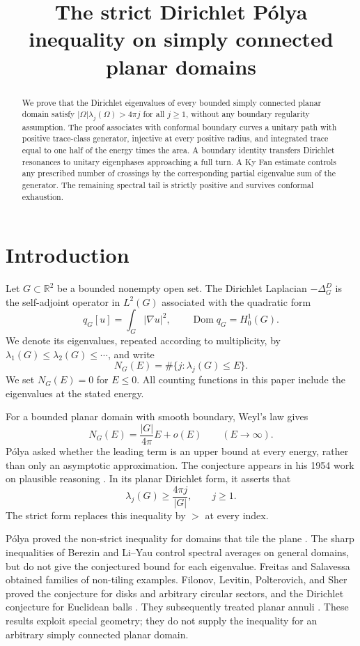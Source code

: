 \documentclass[11pt]{amsart}
\title[The strict Dirichlet P\'olya inequality]{The strict Dirichlet P\'olya inequality on simply connected planar domains}
\date{}
\numberwithin{equation}{section}
\newcommand{\Dom}{\operatorname{Dom}}
\begin{document}
\begin{abstract}
We prove that the Dirichlet eigenvalues of every bounded simply connected
planar domain satisfy $|\Omega|\lambda_j(\Omega)>4\pi j$ for all $j\ge1$,
without any boundary regularity assumption. The proof associates with
conformal boundary curves a unitary path with positive trace-class
generator, injective at every positive radius, and integrated trace
equal to one half of the energy times the area. A boundary identity transfers Dirichlet
resonances to unitary eigenphases approaching a full turn. A Ky Fan
estimate controls any prescribed number of crossings by the corresponding
partial eigenvalue sum of the generator. The remaining spectral tail is
strictly positive and survives conformal exhaustion.
\end{abstract}
\maketitle

\section{Introduction}

Let $G\subset\mathbb R^2$ be a bounded nonempty open set.
The Dirichlet Laplacian $-\Delta_G^D$ is the self-adjoint operator in
$L^2(G)$ associated with the quadratic form
\[
 q_G[u]=\int_G|\nabla u|^2,\qquad \Dom q_G=H_0^1(G).
\]
We denote its eigenvalues, repeated according to multiplicity, by
$\lambda_1(G)\le\lambda_2(G)\le\cdots$, and write
\[
 N_G(E)=\#\{j:\lambda_j(G)\le E\}.
\]
We set $N_G(E)=0$ for $E\le0$. All counting functions in this paper
include the eigenvalues at the stated energy.

For a bounded planar domain with smooth boundary, Weyl's law
\cite{Weyl} gives
\[
 N_G(E)=\frac{|G|}{4\pi}E+o(E)\qquad(E\to\infty).
\]
P\'olya asked whether the leading term is an upper bound at every
energy, rather than only an asymptotic approximation. The conjecture
appears in his 1954 work on plausible reasoning \cite{Polya54}.
In its planar Dirichlet form, it asserts that
\[
 \lambda_j(G)\ge\frac{4\pi j}{|G|},\qquad j\ge1.
\]
The strict form replaces this inequality by $>$ at every index.

P\'olya proved the non-strict inequality for domains that tile the
plane \cite{Polya61}. The sharp inequalities of Berezin \cite{Berezin}
and Li--Yau \cite{LiYau} control spectral averages on general domains,
but do not give the conjectured bound for each eigenvalue. Freitas and
Salavessa \cite{FS} obtained families of non-tiling examples. Filonov,
Levitin, Polterovich, and Sher proved the conjecture for disks and
arbitrary circular sectors, and the Dirichlet conjecture for Euclidean
balls \cite{FLPSballs}. They subsequently treated planar annuli
\cite{FLPSannuli}. These results exploit special geometry; they do not
supply the inequality for an arbitrary simply connected planar domain.
\end{document}
